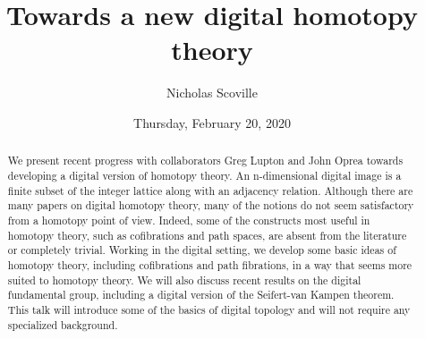 \documentclass{UAmathtalk}
\author{Nicholas Scoville}
\title{Towards a new digital homotopy theory}
\date{Thursday, February 20, 2020}
\begin{document}
\maketitle

\begin{abstract}
We present recent progress with collaborators Greg Lupton and John Oprea towards developing a digital version of homotopy theory.  An n-dimensional digital image is a finite subset of the integer lattice along with an adjacency relation.  Although there are many papers on digital homotopy theory,  many of the notions do not seem satisfactory from a homotopy point of view.  Indeed, some of the constructs most useful in homotopy theory, such as cofibrations and path spaces, are absent from the literature or completely trivial.  Working in the digital setting, we develop some basic ideas of homotopy theory, including cofibrations and path fibrations, in a way that seems more suited to homotopy theory.  We will also discuss recent results on the digital fundamental group, including a digital version of the Seifert-van Kampen theorem.  This talk will introduce some of the basics of digital topology and will not require any specialized background.
\end{abstract}
\end{document}
